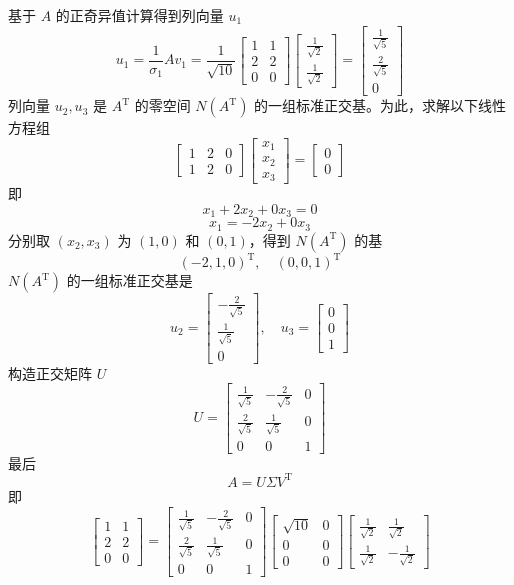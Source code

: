 \documentclass[UTF8,12pt,a4paper,fontset=fandol]{ctexart}
\begin{document}
基于 $A$ 的正奇异值计算得到列向量 $u_1$
\[
u_1=\frac{1}{\sigma_1}Av_1=
\frac{1}{\sqrt{10}}
\begin{bmatrix}
1&1\\
2&2\\
0&0
\end{bmatrix}
\begin{bmatrix}
\frac{1}{\sqrt2}\\[2mm]
\frac{1}{\sqrt2}
\end{bmatrix}
=
\begin{bmatrix}
\frac{1}{\sqrt5}\\[2mm]
\frac{2}{\sqrt5}\\[2mm]
0
\end{bmatrix}
\]
列向量 $u_2,u_3$ 是 $A^{\mathrm{T}}$ 的零空间 $N(A^{\mathrm{T}})$ 的一组标准正交基。为此，求解以下线性方程组
\[
\begin{bmatrix}
1&2&0\\
1&2&0
\end{bmatrix}
\begin{bmatrix}
x_1\\x_2\\x_3
\end{bmatrix}
=
\begin{bmatrix}
0\\0
\end{bmatrix}
\]
即
\[
x_1+2x_2+0x_3=0
\]
\[
x_1=-2x_2+0x_3
\]
分别取 $(x_2,x_3)$ 为 $(1,0)$ 和 $(0,1)$，得到 $N(A^{\mathrm{T}})$ 的基
\[
(-2,1,0)^{\mathrm{T}},\quad(0,0,1)^{\mathrm{T}}
\]
$N(A^{\mathrm{T}})$ 的一组标准正交基是
\[
u_2=\begin{bmatrix}-\frac{2}{\sqrt5}\\[2mm]\frac{1}{\sqrt5}\\[2mm]0\end{bmatrix},\quad
u_3=\begin{bmatrix}0\\0\\1\end{bmatrix}
\]
构造正交矩阵 $U$
\[
U=
\begin{bmatrix}
\frac{1}{\sqrt5}&-\frac{2}{\sqrt5}&0\\[2mm]
\frac{2}{\sqrt5}&\frac{1}{\sqrt5}&0\\[2mm]
0&0&1
\end{bmatrix}
\]
最后
\[
A=U\Sigma V^{\mathrm{T}}
\]
即
\[
\begin{bmatrix}
1&1\\
2&2\\
0&0
\end{bmatrix}
=
\begin{bmatrix}
\frac{1}{\sqrt5}&-\frac{2}{\sqrt5}&0\\[2mm]
\frac{2}{\sqrt5}&\frac{1}{\sqrt5}&0\\[2mm]
0&0&1
\end{bmatrix}
\begin{bmatrix}
\sqrt{10}&0\\
0&0\\
0&0
\end{bmatrix}
\begin{bmatrix}
\frac{1}{\sqrt2}&\frac{1}{\sqrt2}\\[2mm]
\frac{1}{\sqrt2}&-\frac{1}{\sqrt2}
\end{bmatrix}
\]
\end{document}
